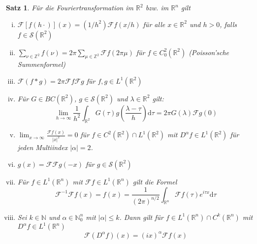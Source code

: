 \documentclass[12pt,a4paper]{scrartcl}
\newtheorem{Satz}{Satz}[section]
\newcommand{\dd}{\mathrm{d}}
\numberwithin{equation}{section}
\newcommand{\R}{\mathbb{R}} %
\newcommand{\Z}{\mathbb{Z}} %
\newcommand{\N}{\mathbb{N}} %
\newcommand{\F}{\mathcal{F}} %
\newcommand{\Sc}{\mathcal{S}} %
\begin{document}
\begin{Satz} \label{Feig}
Für die Fouriertransformation im $\R^2$ bzw. im $\R^n$ gilt
\begin{enumerate}[(i)]  
\item \label{Feig6}$\F[f(h \cdot)](x) = (1/h^2) \F f (x/h)$ für alle $x \in \R^2$ und $h>0$, falls $f \in \Sc(\R^2)$
\item \label{FeigPoisson}$\sum_{\nu \in \Z^2}f(\nu) = 2 \pi \sum_{\mu \in \Z^2}\F f(2\pi \mu)$ für $f \in C_0^2(\R^2)$ (Poisson'sche Summenformel)
\item \label{Feig7}$\F ( f \ast g ) = 2 \pi \F f \F g$ für $f,g \in L^1(\R^2)$
\item \label{Feig1} Für $G\in BC(\R^2)$, $g \in \Sc(\R^2)$ und $\lambda \in \R ^2$ gilt: 
\[
 \lim_{h \to \infty} \frac{1}{h^2} \int_{\R^2} G(\tau) g \left(\frac{\lambda - \tau}{h} \right)\dd \tau = 2 \pi G(\lambda) \F g(0)
\]
\item \label{Feig2} $\lim_{x\to \infty} \frac{\F f (x)}{|x|^2} = 0$ für $f \in C^2(\R^2) \cap L^1(\R^2)$ mit $D^\alpha f \in L^1(\R^2)$ für jeden Multiindex $|\alpha|=2$.
\item $g(x) = \F \F g(-x)$ für $g \in \Sc(\R^2)$  \label{Feig3}
\item \label{Feig4} Für $f\in L^1(\R^n)$ mit $\F f \in L^1(\R^n)$ gilt die Formel
\[
\F^{-1} \F f(x) = f(x) = \frac{1}{(2\pi)^{n/2}}\int_{\R^n} \F f(\tau) e^{i \tau x} \dd \tau
\]
\item \label{Feig5} Sei $k \in \N$ und $\alpha\in \N_0^n$ mit $|\alpha| \leq k$. Dann gilt für $f \in L^1(\R^n) \cap C^k(\R^n)$ mit $D^\alpha f \in L^1(\R^n)$
\[
\F ( D^\alpha f)(x) = (i x)^\alpha \F f (x)
\] 
\end{enumerate}
\end{Satz}
\end{document}
